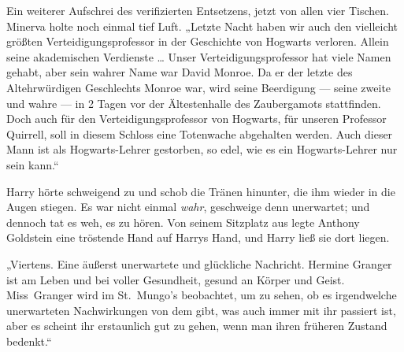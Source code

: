 Ein weiterer Aufschrei des verifizierten Entsetzens, jetzt von allen vier Tischen.
Minerva holte noch einmal tief Luft.
„Letzte Nacht haben wir auch den vielleicht größten Verteidigungsprofessor in der Geschichte von Hogwarts verloren. Allein seine akademischen Verdienste … Unser Verteidigungsprofessor hat viele Namen gehabt, aber sein wahrer Name war David Monroe. Da er der letzte des Altehrwürdigen Geschlechts Monroe war, wird seine Beerdigung — seine zweite und wahre — in 2 Tagen vor der Ältestenhalle des Zaubergamots stattfinden. Doch auch für den Verteidigungsprofessor von Hogwarts, für unseren Professor Quirrell, soll in diesem Schloss eine Totenwache abgehalten werden. Auch dieser Mann ist als Hogwarts-Lehrer gestorben, so edel, wie es ein Hogwarts-Lehrer nur sein kann.“

Harry hörte schweigend zu und schob die Tränen hinunter, die ihm wieder in die Augen stiegen. Es war nicht einmal \emph{wahr}, geschweige denn unerwartet; und dennoch tat es weh, es zu hören. Von seinem Sitzplatz aus legte Anthony Goldstein eine tröstende Hand auf Harrys Hand, und Harry ließ sie dort liegen.

„Viertens. Eine äußerst unerwartete und glückliche Nachricht. Hermine Granger ist am Leben und bei voller Gesundheit, gesund an Körper und Geist. Miss~Granger wird im St.~Mungo’s beobachtet, um zu sehen, ob es irgendwelche unerwarteten Nachwirkungen von dem gibt, was auch immer mit ihr passiert ist, aber es scheint ihr erstaunlich gut zu gehen, wenn man ihren früheren Zustand bedenkt.“

